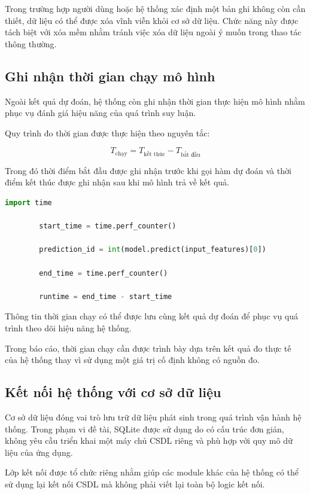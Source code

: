 \documentclass[14pt]{extarticle}
\begin{document}
	\noindent Trong trường hợp người dùng hoặc hệ thống xác định một bản ghi không còn cần thiết, dữ liệu có thể được xóa vĩnh viễn khỏi cơ sở dữ liệu. Chức năng này được tách biệt với xóa mềm nhằm tránh việc xóa dữ liệu ngoài ý muốn trong thao tác thông thường.
	
	\subsection{Ghi nhận thời gian chạy mô hình}
	
	\noindent Ngoài kết quả dự đoán, hệ thống còn ghi nhận thời gian thực hiện mô hình nhằm phục vụ đánh giá hiệu năng của quá trình suy luận.
	
	\noindent Quy trình đo thời gian được thực hiện theo nguyên tắc:
	
	$$
	T_{\text{chạy}} =
	T_{\text{kết thúc}} -
	T_{\text{bắt đầu}}
	$$
	
	\noindent Trong đó thời điểm bắt đầu được ghi nhận trước khi gọi hàm dự đoán và thời điểm kết thúc được ghi nhận sau khi mô hình trả về kết quả.
	
	\begin{lstlisting}[language=Python, numbers=none]
		import time
		
		start_time = time.perf_counter()
		
		prediction_id = int(model.predict(input_features)[0])
		
		end_time = time.perf_counter()
		
		runtime = end_time - start_time
	\end{lstlisting}
	
	\noindent Thông tin thời gian chạy có thể được lưu cùng kết quả dự đoán để phục vụ quá trình theo dõi hiệu năng hệ thống.
	
	\noindent Trong báo cáo, thời gian chạy cần được trình bày dựa trên kết quả đo thực tế của hệ thống thay vì sử dụng một giá trị cố định không có nguồn đo.
	
	\subsection{Kết nối hệ thống với cơ sở dữ liệu}
	
	\noindent Cơ sở dữ liệu đóng vai trò lưu trữ dữ liệu phát sinh trong quá trình vận hành hệ thống. Trong phạm vi đề tài, SQLite được sử dụng do có cấu trúc đơn giản, không yêu cầu triển khai một máy chủ CSDL riêng và phù hợp với quy mô dữ liệu của ứng dụng.
	
	\noindent Lớp kết nối được tổ chức riêng nhằm giúp các module khác của hệ thống có thể sử dụng lại kết nối CSDL mà không phải viết lại toàn bộ logic kết nối.
	
\end{document}
